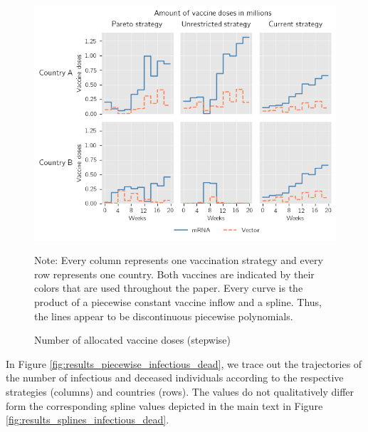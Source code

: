 \begin{figure}[h!]
\centering
\includegraphics[scale=0.6]{images/piecewise_vaccine_total_quantity.png}
\begin{flushleft}
\scriptsize{Note:} Every column represents one vaccination strategy and every row represents one country. Both vaccines are indicated by their colors that are used throughout the paper. 
Every curve is the product of a piecewise constant vaccine inflow and a spline. Thus, the lines appear to be discontinuous piecewise polynomials. 
\end{flushleft}
\caption{Number of allocated vaccine doses (stepwise)}
\label{fig:results_piecewise_allocation}
\end{figure}
In Figure \ref{fig:results_piecewise_infectious_dead}, we trace out the trajectories of the number of infectious and deceased individuals according to the respective strategies (columns) and countries (rows). The values do not qualitatively differ form the corresponding spline values depicted in the main text in Figure \ref{fig:results_splines_infectious_dead}.\\

